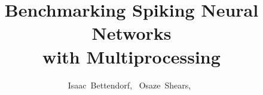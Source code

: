 \documentclass[journal]{IEEEtran}
\begin{document}
%



\title{Benchmarking Spiking Neural Networks\\ with Multiprocessing}
%
%
%

\author{Isaac~Bettendorf,~
        Osaze~Shears,~
}






% 
%
\end{document}
